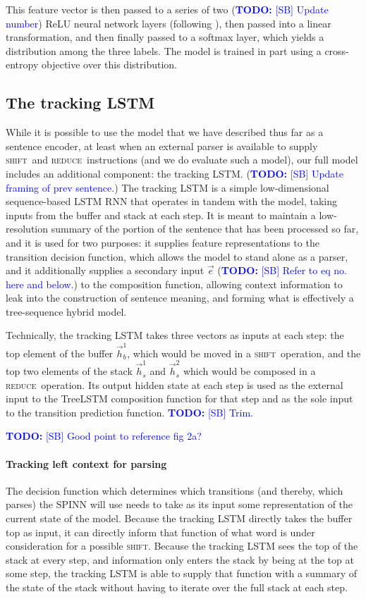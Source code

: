 \documentclass[11pt]{article}
\newcommand\todo[1]{\textcolor{blue}{\textbf{TODO:} #1}}
\newcommand{\shift}{\textsc{shift}}
\newcommand{\reduce}{\textsc{reduce}}
\begin{document}
This feature vector is then passed to a series of two (\todo{[SB] Update number}) ReLU neural network layers (following \citet{snli:emnlp2015}), then passed into a linear transformation, and then finally passed to a softmax layer, which yields a distribution among the three labels. The model is trained in part using a cross-entropy objective over this distribution.

\subsection{The tracking LSTM}

While it is possible to use the model that we have described thus far as a sentence encoder, at least when an external parser is available to supply \shift~and \reduce~instructions (and we do evaluate such a model), our full model includes an additional component: the tracking LSTM. (\todo{[SB] Update framing of prev sentence.}) The tracking LSTM is a simple low-dimensional sequence-based LSTM RNN that operates in tandem with the model, taking inputs from the buffer and stack at each step. It is meant to maintain a low-resolution summary of the portion of the sentence that has been processed so far, and it is used for two purposes: it supplies feature representations to the transition decision function, which allows the model to stand alone as a parser, and it additionally supplies a secondary input $\vec{e}$ (\todo{[SB] Refer to eq no. here and below.}) to the composition function, allowing context information to leak into the construction of sentence meaning, and forming what is effectively a tree-sequence hybrid model.

Technically, the tracking LSTM takes three vectors as inputs at each step: the top element of the buffer $\vec{h}_b^1$, which would be moved in a \shift~operation, and the top two elements of the stack $\vec{h}_s^1$ and $\vec{h}_s^2$ which would be composed in a \reduce~operation. Its output hidden state at each step is used as the external input to the TreeLSTM composition function for that step and as the sole input to the transition prediction function. \todo{[SB] Trim.}

\todo{[SB] Good point to reference fig 2a?}

\paragraph{Tracking left context for parsing} The decision function which determines which transitions (and thereby, which parses) the SPINN will use needs to take as its input some representation of the current state of the model. Because the tracking LSTM directly takes the buffer top as input, it can directly inform that function of what word is under consideration for a possible \shift. Because the tracking LSTM sees the top of the stack at every step, and information only enters the stack by being at the top at some step, the tracking LSTM is able to supply that function with a summary of the state of the stack without having to iterate over the full stack at each step.
\end{document}
